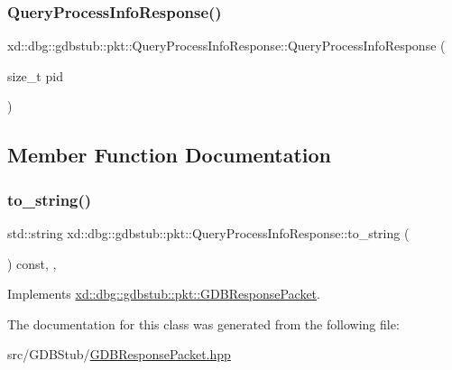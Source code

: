 \subsubsection{\texorpdfstring{Query\+Process\+Info\+Response()}{QueryProcessInfoResponse()}}
{\footnotesize\ttfamily xd\+::dbg\+::gdbstub\+::pkt\+::\+Query\+Process\+Info\+Response\+::\+Query\+Process\+Info\+Response (\begin{DoxyParamCaption}\item[{size\+\_\+t}]{pid }\end{DoxyParamCaption})\hspace{0.3cm}{\ttfamily [inline]}}



\subsection{Member Function Documentation}
\mbox{\label{classxd_1_1dbg_1_1gdbstub_1_1pkt_1_1_query_process_info_response_a7ef463878fed6534fd3f88b4c3c30b17}} 
\subsubsection{\texorpdfstring{to\+\_\+string()}{to\_string()}}
{\footnotesize\ttfamily std\+::string xd\+::dbg\+::gdbstub\+::pkt\+::\+Query\+Process\+Info\+Response\+::to\+\_\+string (\begin{DoxyParamCaption}{ }\end{DoxyParamCaption}) const\hspace{0.3cm}{\ttfamily [inline]}, {\ttfamily [override]}, {\ttfamily [virtual]}}



Implements \mbox{\hyperlink{classxd_1_1dbg_1_1gdbstub_1_1pkt_1_1_g_d_b_response_packet_a2a15795536cd5ff94f0533c406233874}{xd\+::dbg\+::gdbstub\+::pkt\+::\+G\+D\+B\+Response\+Packet}}.



The documentation for this class was generated from the following file\+:\begin{DoxyCompactItemize}
\item 
src/\+G\+D\+B\+Stub/\mbox{\hyperlink{_g_d_b_response_packet_8hpp}{G\+D\+B\+Response\+Packet.\+hpp}}\end{DoxyCompactItemize}
